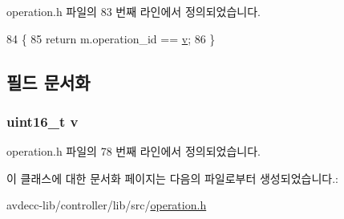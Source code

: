operation.\+h 파일의 83 번째 라인에서 정의되었습니다.


\begin{DoxyCode}
84     \{
85         \textcolor{keywordflow}{return} m.operation\_id == \hyperlink{classavdecc__lib_1_1operation__id__comp_ac5f38113a34f9eab3e7782eade81d266}{v};
86     \}
\end{DoxyCode}


\subsection{필드 문서화}
\subsubsection[{\texorpdfstring{v}{v}}]{\setlength{\rightskip}{0pt plus 5cm}uint16\+\_\+t v\hspace{0.3cm}{\ttfamily [private]}}\hypertarget{classavdecc__lib_1_1operation__id__comp_ac5f38113a34f9eab3e7782eade81d266}{}\label{classavdecc__lib_1_1operation__id__comp_ac5f38113a34f9eab3e7782eade81d266}


operation.\+h 파일의 78 번째 라인에서 정의되었습니다.



이 클래스에 대한 문서화 페이지는 다음의 파일로부터 생성되었습니다.\+:\begin{DoxyCompactItemize}
\item 
avdecc-\/lib/controller/lib/src/\hyperlink{operation_8h}{operation.\+h}\end{DoxyCompactItemize}
